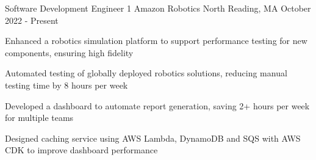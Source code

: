 

\begin{cventries}

  
  \cventry
  {Software Development Engineer 1}
  {Amazon Robotics}
  {North Reading, MA}
  {October 2022 - Present}
  {\begin{cvitems}
	  \item { Enhanced a robotics simulation platform to support performance testing for new components, ensuring high fidelity}
	  \item {Automated testing of globally deployed robotics solutions, reducing manual testing time by 8 hours per week}
	  \item {Developed a dashboard to automate report generation, saving 2+ hours per week for multiple teams}
	  \item {Designed caching service using AWS Lambda, DynamoDB and SQS with AWS CDK to improve dashboard performance}
	  \end{cvitems}}


\end{cventries}
